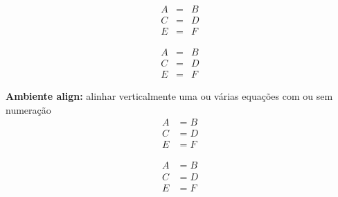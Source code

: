 \documentclass[12pt]{article}
\begin{document}
\begin{eqnarray} %
A & = & B\\ 
C & = & D\\ 
E & = & F
\end{eqnarray}


\begin{eqnarray} 
A & = & B\\ 
\nonumber C & = & D\\  %
\nonumber E & = & F
\end{eqnarray}


\noindent \textbf{{Ambiente align:}} alinhar verticalmente uma ou várias equações com ou sem numeração
\begin{align*}
A & = B\\
C & = D\\
E & = F
\end{align*}


\begin{align}
A & = B\\
C & = D\\ 
\nonumber E & = F
\end{align}
\end{document}
